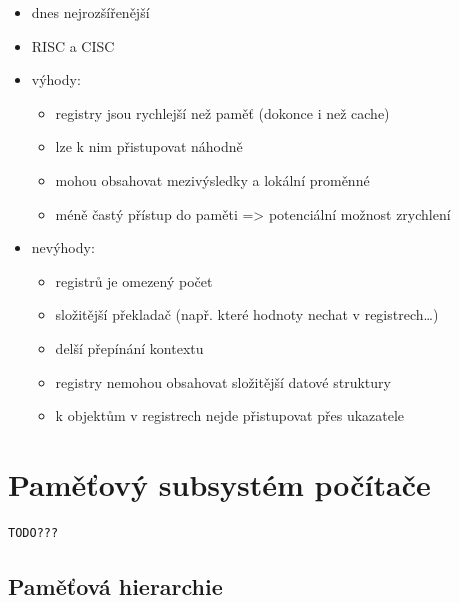 \documentclass{szzclass}
\providecommand{\tightlist}{%
  \setlength{\itemsep}{0pt}\setlength{\parskip}{0pt}}
\begin{document}
\begin{itemize}
\tightlist
\item
  dnes nejrozšířenější
\item
  RISC a CISC
\item
  výhody:

  \begin{itemize}
  \tightlist
  \item
    registry jsou rychlejší než paměť (dokonce i než cache)
  \item
    lze k nim přistupovat náhodně
  \item
    mohou obsahovat mezivýsledky a lokální proměnné
  \item
    méně častý přístup do paměti =\textgreater{} potenciální možnost
    zrychlení
  \end{itemize}
\item
  nevýhody:

  \begin{itemize}
  \tightlist
  \item
    registrů je omezený počet
  \item
    složitější překladač (např. které hodnoty nechat v registrech\ldots)
  \item
    delší přepínání kontextu
  \item
    registry nemohou obsahovat složitější datové struktury
  \item
    k objektům v registrech nejde přistupovat přes ukazatele
  \end{itemize}
\end{itemize}

\hypertarget{pamux11bux165ovuxfd-subsystuxe9m-poux10duxedtaux10de}{%
\section{Paměťový subsystém
počítače}\label{pamux11bux165ovuxfd-subsystuxe9m-poux10duxedtaux10de}}

\begin{verbatim}
TODO???
\end{verbatim}

\hypertarget{pamux11bux165ovuxe1-hierarchie}{%
\subsection{Paměťová
hierarchie}\label{pamux11bux165ovuxe1-hierarchie}}
\end{document}
